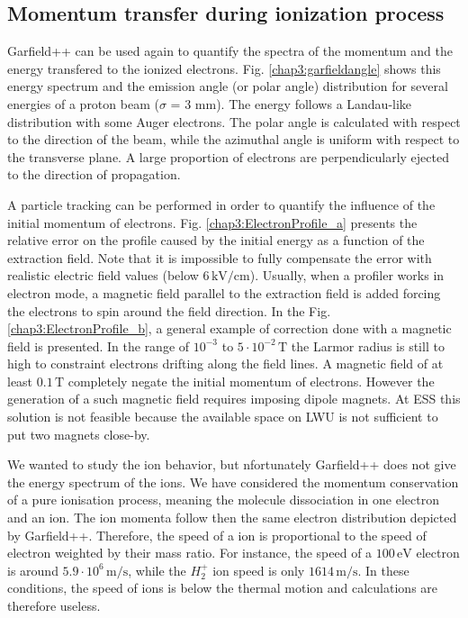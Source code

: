 \begin{refsection}
  \subsection{Momentum transfer during ionization process}
  Garfield++ can be used again to quantify the spectra of the momentum and the energy transfered to the ionized electrons. Fig. \ref{chap3:garfieldangle} shows this energy spectrum and the emission angle (or polar angle) distribution for several energies of a proton beam ($\sigma$ = 3 mm). The energy follows a Landau-like distribution with some Auger electrons. The polar angle is calculated with respect to the direction of the beam, while the azimuthal angle is uniform with respect to the transverse plane. A large proportion of electrons are perpendicularly ejected to the direction of propagation.

  

  A particle tracking can be performed in order to quantify the influence of the initial momentum of electrons. Fig. \ref{chap3:ElectronProfile_a} presents the relative error on the profile caused by the initial energy as a function of the extraction field. Note that it is impossible to fully compensate the error with realistic electric field values (below $6\,\mathrm{kV/cm}$). Usually, when a profiler works in electron mode, a magnetic field parallel to the extraction field is added forcing the electrons to spin around the field direction. In the Fig. \ref{chap3:ElectronProfile_b}, a general example of correction done with a magnetic field is presented. In the range of $10^{-3}$ to $5\cdot10^{-2}\,\mathrm{T}$ the Larmor radius is still to high to constraint electrons drifting along the field lines.
  A magnetic field of at least $0.1\,\mathrm{T}$ completely negate the initial momentum of electrons. However the generation of a such magnetic field requires imposing dipole magnets. At ESS this solution is not feasible because the available space on LWU is not sufficient to put two magnets close-by.

  

  We wanted to study the ion behavior, but nfortunately Garfield++ does not give the energy spectrum of the ions.
  We have considered the momentum conservation of a pure ionisation process, meaning the molecule dissociation in one electron and an ion. The ion momenta follow then the same electron distribution depicted by Garfield++. Therefore, the speed of a ion is proportional to the speed of electron weighted by their mass ratio. For instance, the speed of a $100\,\mathrm{eV}$ electron is around $5.9\cdot10^{6}\,\mathrm{m/s}$, while the $H_{2}^{+}$ ion speed is only $1614\,\mathrm{m/s}$. In these conditions, the speed of ions is below the thermal motion and calculations are therefore useless.



\end{refsection}
